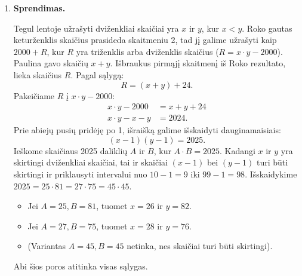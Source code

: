 \documentclass[11pt,a4paper]{article}
\begin{document}
\begin{enumerate}
    Tegu upės tėkmės greitis yra $c$ (km/h). Stovinčiame vandenyje profesoriaus greitis $v = 7$ (km/h).
    Kelionė prieš srovę užtruko 8 valandas, taigi atstumas iki poilsio vietos yra:
    \[ s = 8(7 - c). \]
    Kelionė namo pasroviui:
    \begin{itemize}
        \item Profesorius 4 valandas irklavo pasroviui, todėl įveikė $4(7 + c)$ kilometrų.
        \item Likusį laiką valtį nešė tik upės srovė. Kadangi kelionė atgal užtruko 2 valandomis trumpiau nei pirmyn, vadinasi, ji truko $8 - 2 = 6$ valandas. Iš jų 4 valandos buvo irkluotos, tad srovė valtį nešė $6 - 4 = 2$ valandas. Nuplauktas atstumas: $2 \cdot c$.
    \end{itemize}
    Bendras atstumas grįžtant yra toks pat:
    \[ s = 4(7 + c) + 2c. \]
    Sulyginame abiejų kelionių atstumus:
    \begin{align*}
        8(7 - c) &= 4(7 + c) + 2c \\
        56 - 8c &= 28 + 4c + 2c \\
        28 &= 14c \implies c = 2\text{ km/h}.
    \end{align*}
    
    \textbf{Atsakymas:} $2$.

    \vspace{0.3cm}
    \item \textbf{Sprendimas.}
    
    Tegul lentoje užrašyti dviženkliai skaičiai yra $x$ ir $y$, kur $x < y$.
    Roko gautas keturženklis skaičius prasideda skaitmeniu 2, tad jį galime užrašyti kaip $2000 + R$, kur $R$ yra triženklis arba dviženklis skaičius ($R = x \cdot y - 2000$).
    Paulina gavo skaičių $x + y$.
    Išbraukus pirmąjį skaitmenį iš Roko rezultato, lieka skaičius $R$. Pagal sąlygą:
    \[ R = (x + y) + 24. \]
    Pakeičiame $R$ į $x \cdot y - 2000$:
    \begin{align*}
        x \cdot y - 2000 &= x + y + 24 \\
        x \cdot y - x - y &= 2024.
    \end{align*}
    Prie abiejų pusių pridėję po 1, išraišką galime išskaidyti dauginamaisiais:
    \[ (x - 1)(y - 1) = 2025. \]
    Ieškome skaičiaus 2025 daliklių $A$ ir $B$, kur $A \cdot B = 2025$. Kadangi $x$ ir $y$ yra skirtingi dviženkliai skaičiai, tai ir skaičiai $(x-1)$ bei $(y-1)$ turi būti skirtingi ir priklausyti intervalui nuo $10-1 = 9$ iki $99-1 = 98$.
    Išskaidykime $2025 = 25 \cdot 81 = 27 \cdot 75 = 45 \cdot 45$. 
    \begin{itemize}
        \item Jei $A = 25, B = 81$, tuomet $x = 26$ ir $y = 82$.
        \item Jei $A = 27, B = 75$, tuomet $x = 28$ ir $y = 76$.
        \item (Variantas $A=45, B=45$ netinka, nes skaičiai turi būti skirtingi).
    \end{itemize}
    Abi šios poros atitinka visas sąlygas.
    

\end{enumerate}
\end{document}

